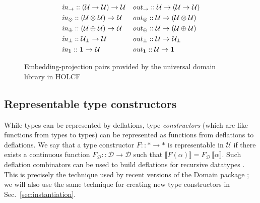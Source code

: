 \documentclass{sigplanconf}
\newcommand{\U}{\ensuremath{\mathcal{U}}}
\newcommand{\D}{\ensuremath{\mathcal{D}}}
\newcommand{\REP}[1]{\ensuremath{\llbracket#1\rrbracket}}
\newcommand{\hsone}{\mathbf{1}}
\newcommand{\hair}{\mskip1mu}
\newcommand{\hsc}[1]{\ensuremath{\mathit{#1}}}
\newcommand{\embedding}{\hsc{in}}
\newcommand{\projection}{\hsc{out}}
\newcommand{\tA}{\alpha}
\theoremstyle{definition}
\begin{document}
\begin{figure}
\begin{align*}
& \embedding_\to :: (\U\to\hair\U)\to\hair\U &
& \projection_\to :: \U\to(\U\to\hair\U) \\
& \embedding_\otimes :: (\U\otimes\hair\U)\to\hair\U &
& \projection_\otimes :: \U\to(\U\otimes\hair\U) \\
& \embedding_\oplus :: (\U\oplus\hair\U)\to\hair\U &
& \projection_\oplus :: \U\to(\U\oplus\hair\U) \\
& \embedding_\bot :: \U_\bot\to\hair\U &
& \projection_\bot :: \U\to\hair\U_\bot \\
& \embedding_\hsone :: \hsone\to\hair\U &
& \projection_\hsone :: \U\to\hsone
\end{align*}
\caption{Embedding-projection pairs provided by the universal domain library in HOLCF}
\label{fig:udom-ep-pairs}
\end{figure}

\subsection{Representable type constructors}
\label{sec:representable-tycons}

While types can be represented by deflations, type \emph{constructors} (which are like functions from types to types) can be represented as functions from deflations to deflations. We say that a type constructor $F :: *\to*$ is representable in $\U$ if there exists a continuous function $F_\D :: \D \to \D$ such that $\REP{F(\tA)} = F_\D\,\REP{\tA}$. Such deflation combinators can be used to build deflations for recursive datatypes \cite[\S7]{Gunter1990}. This is precisely the technique used by recent versions of the Domain package \cite[\S6.6]{holcf11}; we will also use the same technique for creating new type constructors in Sec.~\ref{sec:instantiation}.
\end{document}
